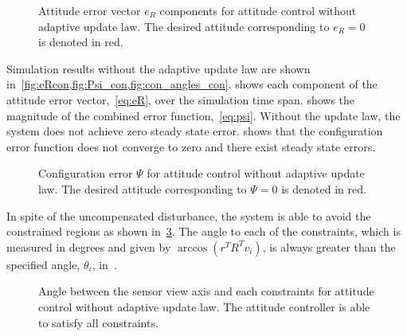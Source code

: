 \begin{figure}[htbp]
    \centering
    
    \caption{Attitude error vector \( e_R \) components for attitude control without adaptive update law.
    The desired attitude corresponding to \( e_R = 0 \) is denoted in red.\label{fig:eRcon}}
\end{figure}
Simulation results without the adaptive update law are shown in~\cref{fig:eRcon,fig:Psi_con,fig:con_angles_con}.
 shows each component of the attitude error vector,~\cref{eq:eR}, over the simulation time span.
 shows the  magnitude of the combined error function,~\cref{eq:psi}.
Without the update law, the system does not achieve zero steady state error. 
 shows that the configuration error function does not converge to zero and there exist steady state errors.
\begin{figure}[htbp]
    \centering
    
    \caption{Configuration error \( \Psi \) for attitude control without adaptive update law.
    The desired attitude corresponding to \( \Psi = 0 \) is denoted in red.\label{fig:Psi_con}}
\end{figure}
In spite of the uncompensated disturbance, the system is able to avoid the constrained regions as shown in~\cref{fig:con_angles_con}.
The angle to each of the constraints, which is measured in degrees and given by \( \arccos(r^T R^T v_i) \), is always greater than the specified angle, \( \theta_i \), in~.
\begin{figure}[htbp]
    \centering
    
    \caption{Angle between the sensor view axis and each constraints for attitude control without adaptive update law.
    The attitude controller is able to satisfy all constraints.\label{fig:con_angles_con}}
\end{figure}

